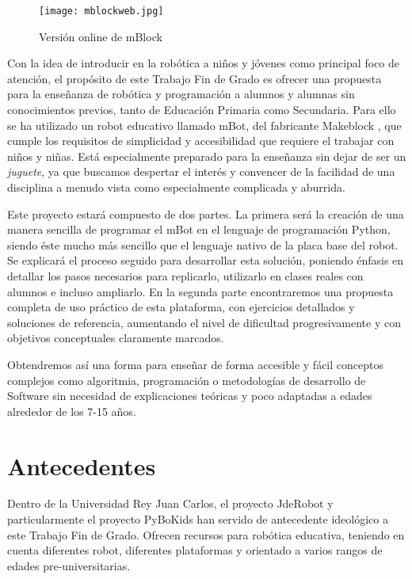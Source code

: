 \begin{description}
	\begin{figure}[h]
		\centering
		\texttt{[image: mblockweb.jpg]}
		\caption{Versión online de mBlock}
		\label{img:mblock}
	\end{figure}
	
\end{description}
\vspace{2cm}
\par Con la idea de introducir en la robótica a niños y jóvenes como principal foco de atención, el propósito de este Trabajo Fin de Grado es ofrecer una propuesta para la enseñanza de robótica y programación a alumnos y alumnas sin conocimientos previos, tanto de Educación Primaria como Secundaria. Para ello se ha utilizado un robot educativo llamado mBot, del fabricante Makeblock \cite{makeblock}, que cumple los requisitos de simplicidad y accesibilidad que requiere el trabajar con niños y niñas. Está especialmente preparado para la enseñanza sin dejar de ser un \textit{juguete}, ya que buscamos despertar el interés y convencer de la facilidad de una disciplina a menudo vista como especialmente complicada y aburrida.

Este proyecto estará compuesto de dos partes. La primera será la creación de una manera sencilla de programar el mBot en el lenguaje de programación Python, siendo éste mucho más sencillo que el lenguaje nativo de la placa base del robot. Se explicará el proceso seguido para desarrollar esta solución, poniendo énfasis en detallar los pasos necesarios para replicarlo, utilizarlo en clases reales con alumnos e incluso ampliarlo. En la segunda parte encontraremos una propuesta completa de uso práctico de esta plataforma, con ejercicios detallados y soluciones de referencia, aumentando el nivel de dificultad progresivamente y con objetivos conceptuales claramente marcados.

Obtendremos así una forma para enseñar de forma accesible y fácil conceptos complejos como algoritmia, programación o metodologías de desarrollo de Software sin necesidad de explicaciones teóricas y poco adaptadas a edades alrededor de los 7-15 años.


\section{Antecedentes}\label{sec:antecedentes}

Dentro de la Universidad Rey Juan Carlos, el proyecto JdeRobot y particularmente el proyecto PyBoKids \cite{JdeRobot} han servido de antecedente ideológico a este Trabajo Fin de Grado. Ofrecen recursos para robótica educativa, teniendo en cuenta diferentes robot, diferentes plataformas y orientado a varios rangos de edades pre-universitarias.\\

